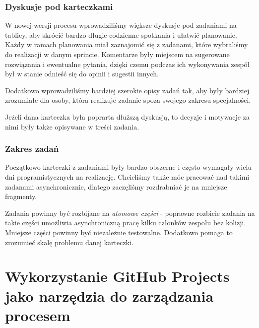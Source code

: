 \documentclass{article}
\begin{document}
\subsubsection*{Dyskusje pod karteczkami}
W nowej wersji procesu wprowadziliśmy większe dyskusje pod zadaniami na tablicy, aby skrócić bardzo długie codzienne spotkania i ułatwić planowanie. Każdy w ramach planowania miał zaznajomić się z zadanami, które wybraliśmy do realizacji w danym sprincie. Komentarze były miejscem na sugerowane rozwiązania i ewentualne pytania, dzięki czemu podczas ich wykonywania zespół był w stanie odnieść się do opinii i sugestii innych.

Dodatkowo wprowadziliśmy bardziej szerokie opisy zadań tak, aby były bardziej zrozumiałe dla osoby, która realizuje zadanie spoza swojego zakresu specjalności.

Jeżeli dana karteczka była poprarta dłuższą dyskusją, to decyzje i motywacje za nimi były także opisywane w treści zadania.

\subsubsection*{Zakres zadań}
Początkowo karteczki z zadaniami były bardzo obszerne i często wymagały wielu dni programistycznych na realizację. Chcieliśmy także móc pracować nad takimi zadanami asynchronicznie, dlatego zaczęliśmy rozdrabniać je na mniejsze fragmenty.

Zadania powinny być rozbijane na \textit{atomowe części} - poprawne rozbicie zadania na takie części umożliwia asynchroniczną pracę kilku członków zespołu bez kolizji. Mniejsze części powinny być niezależnie testowalne. Dodatkowo pomaga to zrozumieć skalę problemu danej karteczki.

\section{Wykorzystanie GitHub Projects jako narzędzia do zarządzania procesem}


\printbibliography
\end{document}
